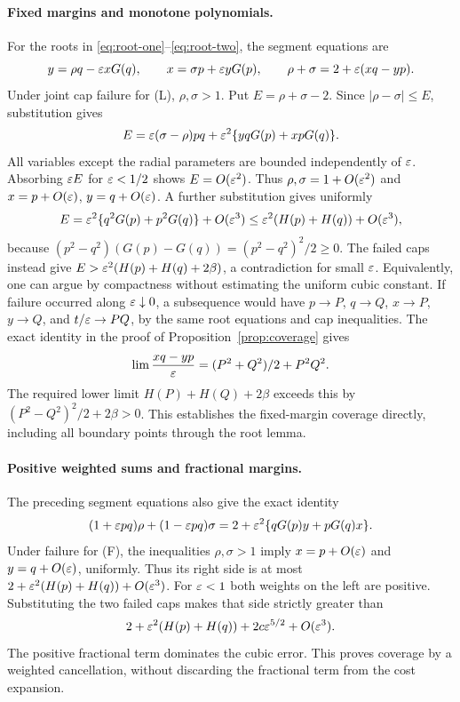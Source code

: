 \paragraph{Fixed margins and monotone polynomials.}
For the roots in \eqref{eq:root-one}--\eqref{eq:root-two}, the segment
equations are
\[
 y=\rho q-\varepsilon xG(q),\qquad
 x=\sigma p+\varepsilon yG(p),\qquad
 \rho+\sigma=2+\varepsilon(xq-yp).
\]
Under joint cap failure for (L), $\rho,\sigma>1$. Put
$E=\rho+\sigma-2$. Since $|\rho-\sigma|\le E$, substitution gives
\[
 E=\varepsilon(\sigma-\rho)pq+\varepsilon^2\{yqG(p)+xpG(q)\}.
\]
All variables except the radial parameters are bounded independently of
$\varepsilon$. Absorbing $\varepsilon E$ for $\varepsilon<1/2$ shows $E=O(\varepsilon^2)$.
Thus $\rho,\sigma=1+O(\varepsilon^2)$ and $x=p+O(\varepsilon)$,
$y=q+O(\varepsilon)$. A further substitution gives uniformly
\[
 E=\varepsilon^2\{q^2G(p)+p^2G(q)\}+O(\varepsilon^3)
 \le\varepsilon^2(H(p)+H(q))+O(\varepsilon^3),
\]
because
$(p^2-q^2)(G(p)-G(q))=(p^2-q^2)^2/2\ge0$.
The failed caps instead give
$E>\varepsilon^2(H(p)+H(q)+2\beta)$, a contradiction for small $\varepsilon$.
Equivalently, one can argue by compactness without estimating the
uniform cubic constant. If failure occurred along $\varepsilon\downarrow0$,
a subsequence would have $p\to P$, $q\to Q$, $x\to P$, $y\to Q$,
and $t/\varepsilon\to PQ$, by the same root equations and cap inequalities.
The exact identity in the proof of Proposition~\ref{prop:coverage} gives
\[
 \lim\frac{xq-yp}{\varepsilon}=(P^2+Q^2)/2+P^2Q^2.
\]
The required lower limit $H(P)+H(Q)+2\beta$ exceeds this by
$(P^2-Q^2)^2/2+2\beta>0$. This establishes the fixed-margin
coverage directly, including all boundary points through the root lemma.

\paragraph{Positive weighted sums and fractional margins.}
The preceding segment equations also give the exact identity
\begin{equation}\label{eq:weighted-radial-identity}
 (1+\varepsilon pq)\rho+(1-\varepsilon pq)\sigma
 =2+\varepsilon^2\{qG(p)y+pG(q)x\}.
\end{equation}
Under failure for (F), the inequalities $\rho,\sigma>1$ imply
$x=p+O(\varepsilon)$ and $y=q+O(\varepsilon)$, uniformly. Thus its right side is
at most $2+\varepsilon^2(H(p)+H(q))+O(\varepsilon^3)$. For $\varepsilon<1$ both
weights on the left are positive. Substituting the two failed caps makes
that side strictly greater than
\[
 2+\varepsilon^2(H(p)+H(q))+2c\varepsilon^{5/2}+O(\varepsilon^3).
\]
The positive fractional term dominates the cubic error. This proves
coverage by a weighted cancellation, without discarding the fractional
term from the cost expansion.

